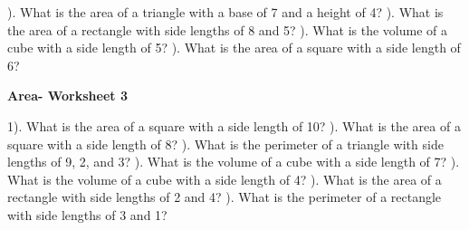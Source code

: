 \documentclass{article}%
\begin{document}
). What is the area of a triangle with a base of 7 and a height of 4?%
\newline%
\newline%
). What is the area of a rectangle with side lengths of 8 and 5?%
\newline%
\newline%
). What is the volume of a cube with a side length of 5?%
\newline%
\newline%
). What is the area of a square with a side length of 6?%
\newline%
\newline%
\newline%
\pagebreak%
\large%
\begin{center}%
\textbf{Area- Worksheet 3}%
\newline%
\newline%
\newline%
\end{center} \normalsize%
1). What is the area of a square with a side length of 10?%
\newline%
\newline%
). What is the area of a square with a side length of 8?%
\newline%
\newline%
). What is the perimeter of a triangle with side lengths of 9, 2, and 3?%
\newline%
\newline%
). What is the volume of a cube with a side length of 7?%
\newline%
\newline%
). What is the volume of a cube with a side length of 4?%
\newline%
\newline%
). What is the area of a rectangle with side lengths of 2 and 4?%
\newline%
\newline%
). What is the perimeter of a rectangle with side lengths of 3 and 1?%
\newline%
\end{document}
